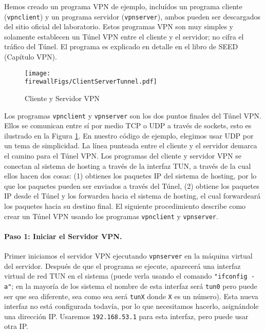 Hemos creado un programa VPN de ejemplo, incluídos un programa cliente (\texttt{vpnclient}) y un programa servidor (\texttt{vpnserver}), ambos pueden ser descargados del sitio oficial del laboratorio. Estos programas VPN son muy simples y solamente establecen un Túnel VPN entre el cliente y el servidor; no cifra el tráfico del Túnel.
El programa es explicado en detalle en el libro de SEED (Capítulo VPN).


\begin{figure}[htb]
\begin{center}
\texttt{[image: \\firewallFigs/ClientServerTunnel.pdf]}
\end{center}
\caption{Cliente y Servidor VPN}
\label{vpn_firewall:fig:client_server}
\end{figure}

Los programas \texttt{vpnclient} y \texttt{vpnserver} son los dos puntos finales del Túnel VPN. Ellos se comunican entre sí por medio TCP o UDP a través de sockets, esto es ilustrado en la Figura \ref{vpn_firewall:fig:client_server}. En nuestro código de ejemplo, elegimos usar UDP por un tema de simplicidad. La línea punteada entre el cliente y el servidor demarca el camino para el Túnel VPN.
Los programas del cliente y servidor VPN se conectan al sistema de hosting a través de la interfaz TUN, a través de la cual ellos hacen dos cosas: (1) obtienes los paquetes IP del sistema de hosting, por lo que los paquetes pueden ser enviados a través del Túnel, (2) obtiene los paquetes IP desde el Túnel y los forwardea hacia el sistema de hosting, el cual forwardeará los paquetes hacia su destino final.
El siguiente procedimiento describe como crear un Túnel VPN usando los programas \texttt{vpnclient} y \texttt{vpnserver}.


\paragraph{Paso 1: Iniciar el Servidor VPN.}
Primer iniciamos el servidor VPN ejecutando \texttt{vpnserver} en la máquina virtual del servidor.
Después de que el programa se ejecute, aparecerá una interfaz virtual de red TUN en el sistema (puede verla usando el comando \texttt{"ifconfig -a"}; en la mayoría de los sistema el nombre de esta interfaz será \texttt{tun0} pero puede ser que sea diferente, sea como sea será \texttt{tunX} donde \texttt{X} es un número).
Esta nueva interfaz no está configurada todavía, por lo que necesitamos hacerlo, asignándole una dirección IP. Usaremos \texttt{192.168.53.1} para esta interfaz, pero puede usar otra IP.

